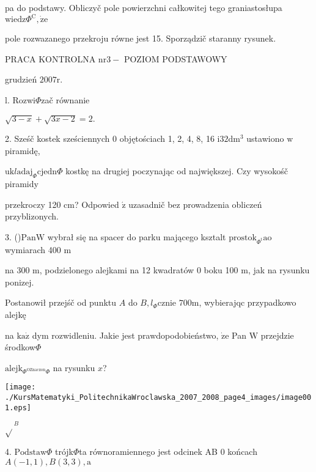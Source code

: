 \documentclass[a4paper,12pt]{article}
\begin{document}
pa do podstawy. Obliczyč pole powierzchni całkowitej tego graniastosłupa $\mathrm{w}\mathrm{i}\mathrm{e}\mathrm{d}\mathrm{z}\Phi^{\mathrm{C}}, \dot{\mathrm{z}}\mathrm{e}$

pole rozwazanego przekroju równe jest 15. Sporządzič staranny rysunek.





PRACA KONTROLNA $\mathrm{n}\mathrm{r}3-$ POZIOM PODSTAWOWY

grudzień $2007\mathrm{r}.$

l. Rozwi$\Phi$zač równanie

$\sqrt{3-x}+\sqrt{3x-2}=2.$

2. Sześč kostek sześciennych $0$ objętościach 1, 2, 4, 8, 16 $\mathrm{i}32\mathrm{d}\mathrm{m}^{3}$ ustawiono $\mathrm{w}$ piramidę,

$\mathrm{u}\mathrm{k}l\mathrm{a}\mathrm{d}\mathrm{a}\mathrm{j}_{\Phi}\mathrm{c}\mathrm{j}\mathrm{e}\mathrm{d}\mathrm{n}\Phi$ kostkę na drugiej poczynając od największej. Czy wysokośč piramidy

przekroczy 120 cm? Odpowied $\acute{\mathrm{z}}$ uzasadnič bez prowadzenia obliczeń przyblizonych.

3. ()$\mathrm{P}\mathrm{a}\mathrm{n}\mathrm{W}$ wybrał się na spacer do parku mającego ksztalt $\mathrm{p}\mathrm{r}\mathrm{o}\mathrm{s}\mathrm{t}\mathrm{o}\mathrm{k}_{\Phi^{\mathrm{t}}}\mathrm{a}\mathrm{o}$ wymiarach 400 $\mathrm{m}$

na 300 $\mathrm{m}$, podzielonego alejkami na 12 kwadratów $0$ boku 100 $\mathrm{m}$, jak na rysunku ponizej.

Postanowił przejśč od punktu $A$ do $B, l_{\Phi}$cznie $700\mathrm{m}$, wybierajqc przypadkowo alejkę

na $\mathrm{k}\mathrm{a}\dot{\mathrm{z}}$ dym rozwidleniu. Jakie jest prawdopodobieństwo, $\dot{\mathrm{z}}\mathrm{e}$ Pan $\mathrm{W}$ przejdzie środkow$\Phi$

$\mathrm{a}\mathrm{l}\mathrm{e}\mathrm{j}\mathrm{k}_{\Phi^{\mathrm{O}\mathrm{Z}\mathrm{n}\mathrm{a}\mathrm{c}\mathrm{z}\mathrm{o}\mathrm{n}}\Phi}$ na rysunku $x$?
\begin{center}
\texttt{[image: ./KursMatematyki\_PolitechnikaWroclawska\_2007\_2008\_page4\_images/image001.eps]}
\end{center}
$\sqrt{}^{B}$

4. $\mathrm{P}\mathrm{o}\mathrm{d}\mathrm{s}\mathrm{t}\mathrm{a}\mathrm{w}\Phi$ trójk$\Phi$ta równoramiennego jest odcinek AB $0$ końcach $A(-1,1), B(3,3), \mathrm{a}$
\end{document}
